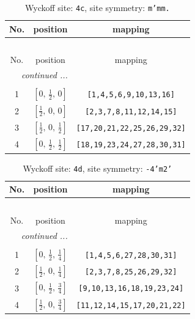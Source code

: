 \documentclass[fleqn,8pt]{jsarticle}
\begin{document}
\renewcommand{\arraystretch}{1.2}
\begin{longtable}{ccc}
\caption{Wyckoff site: {\tt 4c}, site symmetry: {\tt m'mm.}}
 \\
 \hline \hline
No. & position & mapping \\ \hline \endfirsthead

\multicolumn{2}{l}{\tablename\ \thetable{}} \\
 \hline \hline
No. & position & mapping \\ \hline \endhead

 \hline \hline
\multicolumn{2}{r}{\footnotesize\it continued ...} \\ \endfoot

 \hline \hline
\multicolumn{2}{r}{} \\ \endlastfoot

1 & $\left[ 0,\, \frac{1}{2},\, 0 \right]$ & {\tt [1,4,5,6,9,10,13,16]} \\ \hline
2 & $\left[ \frac{1}{2},\, 0,\, 0 \right]$ & {\tt [2,3,7,8,11,12,14,15]} \\ \hline
3 & $\left[ \frac{1}{2},\, 0,\, \frac{1}{2} \right]$ & {\tt [17,20,21,22,25,26,29,32]} \\ \hline
4 & $\left[ 0,\, \frac{1}{2},\, \frac{1}{2} \right]$ & {\tt [18,19,23,24,27,28,30,31]} \\
\end{longtable}
\renewcommand{\arraystretch}{1.2}
\begin{longtable}{ccc}
\caption{Wyckoff site: {\tt 4d}, site symmetry: {\tt -4'm2'}}
 \\
 \hline \hline
No. & position & mapping \\ \hline \endfirsthead

\multicolumn{2}{l}{\tablename\ \thetable{}} \\
 \hline \hline
No. & position & mapping \\ \hline \endhead

 \hline \hline
\multicolumn{2}{r}{\footnotesize\it continued ...} \\ \endfoot

 \hline \hline
\multicolumn{2}{r}{} \\ \endlastfoot

1 & $\left[ 0,\, \frac{1}{2},\, \frac{1}{4} \right]$ & {\tt [1,4,5,6,27,28,30,31]} \\ \hline
2 & $\left[ \frac{1}{2},\, 0,\, \frac{1}{4} \right]$ & {\tt [2,3,7,8,25,26,29,32]} \\ \hline
3 & $\left[ 0,\, \frac{1}{2},\, \frac{3}{4} \right]$ & {\tt [9,10,13,16,18,19,23,24]} \\ \hline
4 & $\left[ \frac{1}{2},\, 0,\, \frac{3}{4} \right]$ & {\tt [11,12,14,15,17,20,21,22]} \\
\end{longtable}
\end{document}
